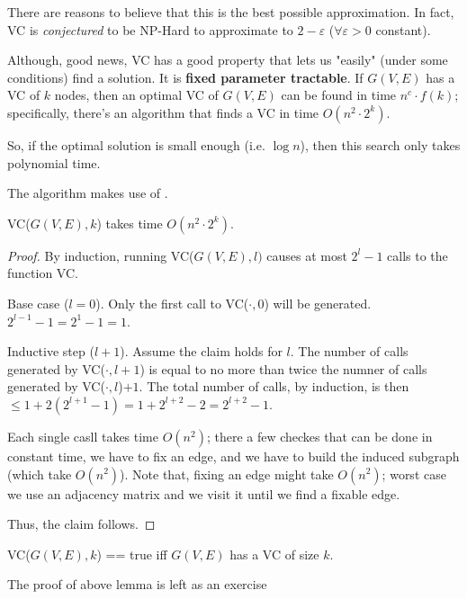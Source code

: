     There are reasons to believe that this is the best possible approximation.
    In fact, VC is \textit{conjectured} to be NP-Hard to approximate to $2 - \varepsilon$ ($\forall \varepsilon > 0$ constant).

    Although, good news, VC has a good property that lets us "easily" (under some conditions) find a solution. It is \textbf{fixed parameter tractable}.
    If $G(V,E)$ has a VC of $k$ nodes, then an optimal VC of $G(V,E)$ can be found in time $n^c \cdot f(k)$; specifically, there's an algorithm that finds a VC in time $O(n^2 \cdot 2^k)$.

    So, if the optimal solution is small enough (i.e. $\log n$), then this search only takes polynomial time.

    The algorithm makes use of .

    

    \begin{lemma}
        VC($G(V,E), k$) takes time $O(n^2 \cdot 2^k)$.
    \end{lemma}

    \begin{proof}
        By induction, running VC($G(V,E), l)$ causes at most $2^l - 1$ calls to the function VC.

        Base case ($l = 0$). Only the first call to VC($\cdot, 0$) will be generated. $2^{l-1} - 1 = 2^1 - 1 = 1$.

        Inductive step ($l+1$). Assume the claim holds for $l$. The number of calls generated by VC($\cdot, l+1$) is equal to no more than twice the numner of calls generated by VC($\cdot, l$)$+1$.
        The total number of calls, by induction, is then $\leq 1 + 2(2^{l+1}-1) = 1 + 2^{l+2} - 2 = 2^{l+2} - 1$.

        Each single casll takes time $O(n^2)$; there a few checkes that can be done in constant time, we have to fix an edge, and we have to build the induced subgraph (which take $O(n^2)$).
        Note that, fixing an edge might take $O(n^2)$; worst case we use an adjacency matrix and we visit it until we find a fixable edge.

        Thus, the claim follows.
    \end{proof}

    \begin{lemma}
        VC($G(V,E), k$) == true iff $G(V,E)$ has a VC of size $k$.
    \end{lemma}

    \begin{exercise}
        The proof of above lemma is left as an exercise
    \end{exercise}
